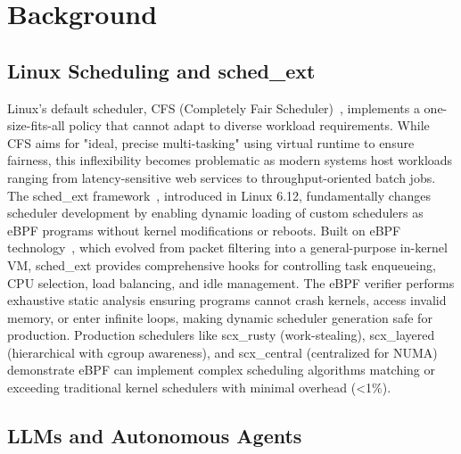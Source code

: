 \section{Background}
\label{sec:background}

\subsection{Linux Scheduling and sched\_ext}

Linux's default scheduler, CFS (Completely Fair Scheduler)~\cite{wong2008cfs}, implements a one-size-fits-all policy that cannot adapt to diverse workload requirements. While CFS aims for "ideal, precise multi-tasking" using virtual runtime to ensure fairness, this inflexibility becomes problematic as modern systems host workloads ranging from latency-sensitive web services to throughput-oriented batch jobs. The sched\_ext framework~\cite{schedext2024}, introduced in Linux 6.12, fundamentally changes scheduler development by enabling dynamic loading of custom schedulers as eBPF programs without kernel modifications or reboots. Built on eBPF technology~\cite{mccanne1993bpf,gregg2019bpf}, which evolved from packet filtering into a general-purpose in-kernel VM, sched\_ext provides comprehensive hooks for controlling task enqueueing, CPU selection, load balancing, and idle management. The eBPF verifier performs exhaustive static analysis ensuring programs cannot crash kernels, access invalid memory, or enter infinite loops, making dynamic scheduler generation safe for production. Production schedulers like scx\_rusty (work-stealing), scx\_layered (hierarchical with cgroup awareness), and scx\_central (centralized for NUMA) demonstrate eBPF can implement complex scheduling algorithms matching or exceeding traditional kernel schedulers with minimal overhead (<1\%).

\subsection{LLMs and Autonomous Agents}

